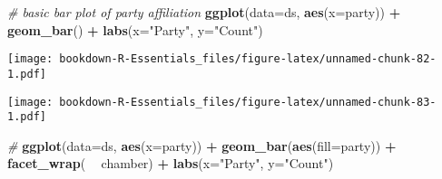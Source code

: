 \documentclass[]{book}
\newenvironment{Shaded}{\begin{snugshade}}{\end{snugshade}}
\newcommand{\KeywordTok}[1]{\textcolor[rgb]{0.13,0.29,0.53}{\textbf{#1}}}
\newcommand{\DataTypeTok}[1]{\textcolor[rgb]{0.13,0.29,0.53}{#1}}
\newcommand{\StringTok}[1]{\textcolor[rgb]{0.31,0.60,0.02}{#1}}
\newcommand{\CommentTok}[1]{\textcolor[rgb]{0.56,0.35,0.01}{\textit{#1}}}
\newcommand{\OperatorTok}[1]{\textcolor[rgb]{0.81,0.36,0.00}{\textbf{#1}}}
\newcommand{\NormalTok}[1]{#1}
\begin{document}
\begin{Shaded}
\begin{Highlighting}[]
\CommentTok{# basic bar plot of party affiliation}
\KeywordTok{ggplot}\NormalTok{(}\DataTypeTok{data=}\NormalTok{ds, }\KeywordTok{aes}\NormalTok{(}\DataTypeTok{x=}\NormalTok{party)) }\OperatorTok{+}\StringTok{ }\KeywordTok{geom_bar}\NormalTok{() }\OperatorTok{+}
\StringTok{  }\KeywordTok{labs}\NormalTok{(}\DataTypeTok{x=}\StringTok{"Party"}\NormalTok{, }\DataTypeTok{y=}\StringTok{"Count"}\NormalTok{)}
\end{Highlighting}
\end{Shaded}

\texttt{[image: bookdown-R-Essentials\_files/figure-latex/unnamed-chunk-82-1.pdf]}

\begin{Shaded}
\end{Shaded}

\texttt{[image: bookdown-R-Essentials\_files/figure-latex/unnamed-chunk-83-1.pdf]}

\begin{Shaded}
\begin{Highlighting}[]
\CommentTok{#}
\KeywordTok{ggplot}\NormalTok{(}\DataTypeTok{data=}\NormalTok{ds, }\KeywordTok{aes}\NormalTok{(}\DataTypeTok{x=}\NormalTok{party)) }\OperatorTok{+}\StringTok{ }
\StringTok{  }\KeywordTok{geom_bar}\NormalTok{(}\KeywordTok{aes}\NormalTok{(}\DataTypeTok{fill=}\NormalTok{party)) }\OperatorTok{+}
\StringTok{  }\KeywordTok{facet_wrap}\NormalTok{( }\OperatorTok{~}\StringTok{ }\NormalTok{chamber) }\OperatorTok{+}
\StringTok{  }\KeywordTok{labs}\NormalTok{(}\DataTypeTok{x=}\StringTok{"Party"}\NormalTok{, }\DataTypeTok{y=}\StringTok{"Count"}\NormalTok{)}
\end{Highlighting}
\end{Shaded}
\end{document}
